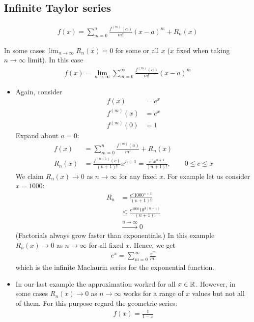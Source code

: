 \subsection{Infinite Taylor series}
\begin{align*}
f(x) = \sum_{m=0}^n \frac{f^{(m)}(a)}{m!} (x-a)^m + R_n(x)
\end{align*}

In some cases $\lim_{n\to \infty} R_n(x) = 0$ for some or all $x$ ($x$ fixed when taking $n \to \infty$ limit). 
In this case 
\begin{align*}
f(x) = \lim_{n \to \infty} \sum_{m=0}^\infty \frac{f^{(m)}(a)}{m!} (x-a)^m
\end{align*}

\begin{ex}
	\begin{itemize}
		\item
		Again, consider
	\begin{align*}
	f(x) & = e^x \\
	f^{(m)}(x) & = e^x \\
	f^{(m)}(0) & = 1
	\end{align*}
	Expand about $a=0$:
	\begin{align*}
	f(x) & =  \sum_{m=0}^n \frac{f^{(m)}(a)}{m!} +R_n(x) \\
	R_n(x) & = \frac{f^{(n+1)}(c)}{(n+1)!} x^{n+1} = \frac{e^cx^{n+1}}{(n+1)!}, \qquad 0 \le c \le x
	\end{align*}
	We claim $R_n(x) \to 0$ as $n \to \infty$ for any fixed $x$. For example let us consider $x= 1000$:
	\begin{align*}
	R_n & = \frac{e^c 1000^{n+1}}{(n+1)!} \\
	& \le \frac{e^{1000} 10^{3(n+1)}}{(n+1)!} \\
	& \overset{n \to \infty}{\to} 0
	\end{align*}
	(Factorials always grow faster than exponentials.)
	In this example $R_n(x) \to 0$ as $n \to \infty$ for all fixed $x$. Hence, we get
	\begin{align*}
	e^x = \sum_{m=0}^\infty \frac {x^m}{m!}
	\end{align*}
	which is the infinite Maclaurin series for the exponential function.
	\item
	In our last example the approximation worked for all $x \in \mathbb R$. However, in some cases $R_n(x) \to 0$ as $n \to \infty$ works for a range of $x$ values but not all of them.
	For this purpose regard the geometric series:
	\begin{align*}
	f(x) = \frac 1 {1-x}

\end{align*}
\end{itemize}
\end{ex}
